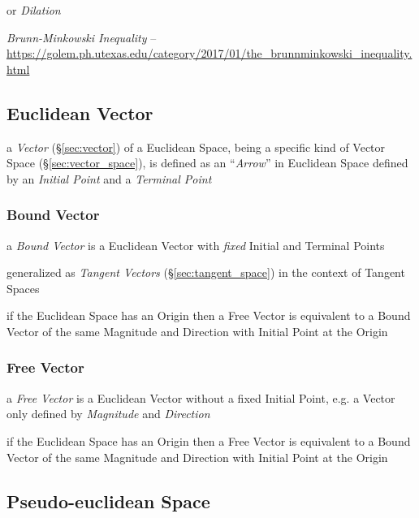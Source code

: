 or \emph{Dilation}

\emph{Brunn-Minkowski Inequality} --
\url{https://golem.ph.utexas.edu/category/2017/01/the_brunnminkowski_inequality.html}



\subsection{Euclidean Vector}\label{sec:euclidean_vector}

a \emph{Vector} (\S\ref{sec:vector}) of a Euclidean Space, being a specific
kind of Vector Space (\S\ref{sec:vector_space}), is defined as an
``\emph{Arrow}'' in Euclidean Space defined by an \emph{Initial Point} and a
\emph{Terminal Point}



\subsubsection{Bound Vector}\label{sec:bound_vector}

a \emph{Bound Vector} is a Euclidean Vector with \emph{fixed} Initial and
Terminal Points

generalized as \emph{Tangent Vectors} (\S\ref{sec:tangent_space}) in the
context of Tangent Spaces

if the Euclidean Space has an Origin then a Free Vector is equivalent to a
Bound Vector of the same Magnitude and Direction with Initial Point at the
Origin



\subsubsection{Free Vector}\label{sec:free_vector}

a \emph{Free Vector} is a Euclidean Vector without a fixed Initial Point, e.g.
a Vector only defined by \emph{Magnitude} and \emph{Direction}

if the Euclidean Space has an Origin then a Free Vector is equivalent to a
Bound Vector of the same Magnitude and Direction with Initial Point at the
Origin



\subsection{Pseudo-euclidean Space}\label{sec:pseudo_euclidean}


